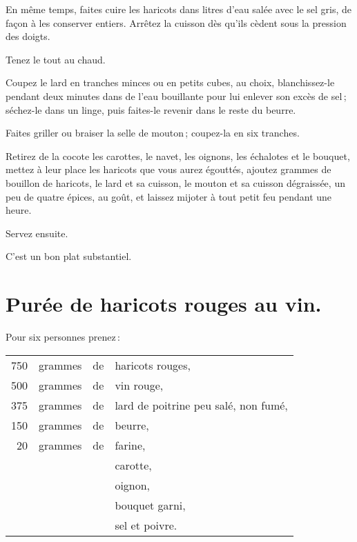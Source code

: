 En même temps, faites cuire les haricots dans {\mmm} litres d'eau salée
avec le sel gris, de façon à les conserver entiers. Arrêtez la cuisson dès
qu'ils cèdent sous la pression des doigts.

Tenez le tout au chaud.

Coupez le lard en tranches minces ou en petits cubes, au choix, blanchissez-le
pendant deux minutes dans de l'eau bouillante pour lui enlever son excès de
sel ; séchez-le dans un linge, puis faites-le revenir dans le reste du beurre.

Faites griller ou braiser la selle de mouton ; coupez-la en six tranches.

Retirez de la cocote les carottes, le navet, les oignons, les échalotes et le
bouquet, mettez à leur place les haricots que vous aurez égouttés, ajoutez
{\mmm} grammes de bouillon de haricots, le lard et sa cuisson, le mouton
et sa cuisson dégraissée, un peu de quatre épices, au goût, et laissez mijoter
à tout petit feu pendant une heure.

Servez ensuite.

C'est un bon plat substantiel.

\section*{\centering Purée de haricots rouges au vin.}
{}

Pour six personnes prenez :

\footnotesize
\begin{longtable}{rrrp{16em}}
    750 & grammes & de & haricots rouges,                                                                 \\
    500 & grammes & de & vin rouge,                                                                       \\
    375 & grammes & de & lard de poitrine peu salé, non fumé,                                             \\
    150 & grammes & de & beurre,                                                                          \\
     20 & grammes & de & farine,                                                                          \\
        &         &    & carotte,                                                                         \\
        &         &    & oignon,                                                                          \\
        &         &    & bouquet garni,                                                                   \\
        &         &    & sel et poivre.                                                                   \\
\end{longtable}
\normalsize

